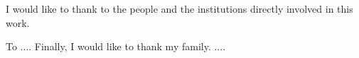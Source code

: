 



I would like to thank to the people and the institutions directly involved in this work.

To ....
Finally, I would like to thank my family. ....



